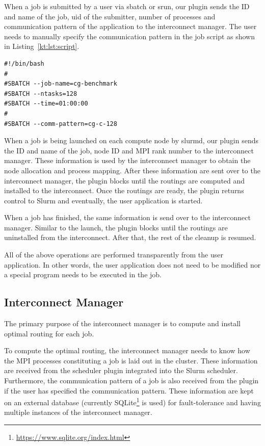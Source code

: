\documentclass[graybox]{svmult}
\begin{document}
When a job is submitted by a user via sbatch or srun, our plugin sends the ID
and name of the job, uid of the submitter, number of processes and
communication pattern of the application to the interconnect manager. The user
needs to manually specify the communication pattern in the job script as shown
in Listing~\ref{kt:lst:script}.

\begin{lstlisting}[float,caption=An example of a job script,label=kt:lst:script]
#!/bin/bash
#
#SBATCH --job-name=cg-benchmark
#SBATCH --ntasks=128
#SBATCH --time=01:00:00
#
#SBATCH --comm-pattern=cg-c-128
\end{lstlisting}

When a job is being launched on each compute node by slurmd, our plugin sends
the ID and name of the job, node ID and MPI rank number to the interconnect
manager. These information is used by the interconnect manager to obtain the
node allocation and process mapping. After these information are sent over to
the interconnect manager, the plugin blocks until the routings are computed
and installed to the interconnect. Once the routings are ready, the plugin
returns control to Slurm and eventually, the user application is started.

When a job has finished, the same information is send over to the interconnect
manager. Similar to the launch, the plugin blocks until the routings are
uninstalled from the interconnect. After that, the rest of the cleanup is
resumed.

All of the above operations are performed transparently from the user
application. In other words, the user application does not need to be modified
nor a special program needs to be executed in the job.

\subsection{Interconnect Manager}

The primary purpose of the interconnect manager is to compute and install
optimal routing for each job.

To compute the optimal routing, the interconnect manager needs to know how
the MPI processes constituting a job is laid out in the cluster. These
information are received from the scheduler plugin integrated into the Slurm
scheduler. Furthermore, the communication pattern of a job is also received
from the plugin if the user has specified the communication pattern. These
information are kept on an external database (currently
SQLite\footnote{\url{https://www.sqlite.org/index.html}} is used) for
fault-tolerance and having multiple instances of the interconnect manager.
\end{document}
